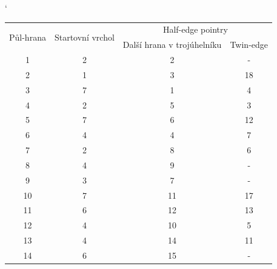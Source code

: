 \documentclass[12pt,a4paper]{article}
\begin{document}
\newpage
\begin{table}[h]
\catcode`
\begin{tabular}{|c||c||c|c|}
\hline
\multirow{2}{*}{Půl-hrana} & \multirow{2}{*}{Startovní vrchol} & \multicolumn{2}{c|}{Half-edge pointry} \\ \cline{3-4} 
                           &                                   & Další hrana v trojúhelníku & Twin-edge \\ \hline
1                          & 2                                 & 2                          & -         \\ \hline
2                          & 1                                 & 3                          & 18        \\ \hline
3                          & 7                                 & 1                          & 4         \\ \hline
4                          & 2                                 & 5                          & 3         \\ \hline
5                          & 7                                 & 6                          & 12        \\ \hline
6                          & 4                                 & 4                          & 7         \\ \hline
7                          & 2                                 & 8                          & 6         \\ \hline
8                          & 4                                 & 9                          & -         \\ \hline
9                          & 3                                 & 7                          & -         \\ \hline
10                         & 7                                 & 11                         & 17        \\ \hline
11                         & 6                                 & 12                         & 13        \\ \hline
12                         & 4                                 & 10                         & 5         \\ \hline
13                         & 4                                 & 14                         & 11        \\ \hline
14                         & 6                                 & 15                         & -         \\ \hline

\end{tabular}
\end{table}
\end{document}
